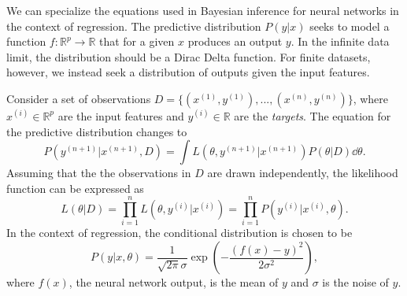 We can specialize the equations used in Bayesian inference for neural networks in the context of regression.
The predictive distribution $P(y|x)$ seeks to model a function $f : \mathbb{R}^p \to \mathbb{R}$ that for a given $x$ produces an output $y$. In the infinite data limit, the distribution should be a Dirac Delta function. For finite datasets, however, we instead seek a distribution of outputs given the input features.

Consider a set of observations $D = \{(x^{(1)}, y^{(1)}), ..., (x^{(n)}, y^{(n)})\}$, where $x^{(i)} \in \mathbb{R}^p$ are the input features and $y^{(i)} \in \mathbb{R}$ are the \textit{targets}. The equation for the predictive distribution changes to
\begin{equation}
  P(y^{(n+1)}|x^{(n+1)}, D) = \int L(\theta, y^{(n+1)}|x^{(n+1)})P(\theta|D)\dd \theta.
\end{equation}
Assuming that the the observations in $D$ are drawn independently, the likelihood function can be expressed as
\begin{equation}
  L(\theta|D) = \prod_{i=1}^n L(\theta, y^{(i)}|x^{(i)}) = \prod_{i=1}^n P(y^{(i)}|x^{(i)}, \theta).
\end{equation}
In the context of regression, the conditional distribution is chosen to be
\begin{equation}
  P(y|x, \theta) = \frac{1}{\sqrt{2\pi}\sigma}\exp\left(-\frac{(f(x) - y)^2}{2\sigma^2}\right),
\end{equation}
where $f(x)$, the neural network output, is the mean of $y$ and $\sigma$ is the noise of $y$.
